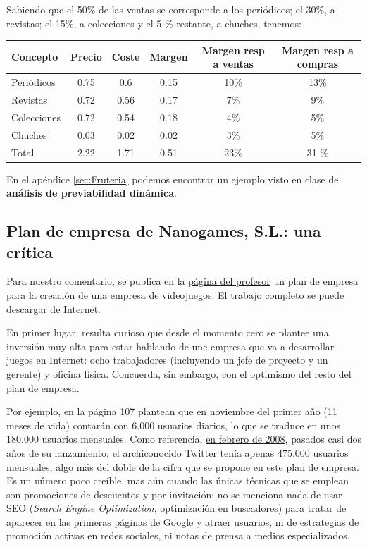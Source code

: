 \documentclass[nochap,palatino,shortheader]{apuntes}
\begin{document}
\begin{example}
Sabiendo que el 50\% de las ventas se corresponde a los periódicos; el 30\%, a revistas; el 15\%, a colecciones y el 5 \% restante, a chuches, tenemos:

\begin{center}
\normalfont\small
\begin{tabular}{l|c|c|c|c|c}
\textbf{Concepto} & \textbf{Precio} & \textbf{Coste} &\textbf{Margen} & \textbf{Margen resp a ventas} & \textbf{Margen resp a compras} \\
\toprule
Periódicos & 0.75 & 0.6 & 0.15 & 10\% & 13\% \\
Revistas & 0.72 & 0.56 & 0.17 & 7\% & 9\%\\
Colecciones & 0.72 & 0.54 & 0.18 & 4\% & 5\%\\
Chuches &0.03 & 0.02 & 0.02 & 3\% & 5\%\\
\bottomrule
Total & 2.22 & 1.71 & 0.51 & 23\% & 31 \% \\
\end{tabular}
\end{center}

\end{example}

En el apéndice \ref{sec:Fruteria} podemos encontrar un ejemplo visto en clase de \textbf{análisis de previabilidad dinámica}.

\subsection{Plan de empresa de Nanogames, S.L.: una crítica}

Para nuestro comentario, se publica en la \href{http://maestremiranda.com/techdir/plan-de-empresa-de-videojuegos-nanogames-s-l/}{página del profesor} un plan de empresa para la creación de una empresa de videojuegos. El trabajo completo \href{https://riunet.upv.es/bitstream/handle/10251/15241/proyecto%20FINAL.pdf}{se puede descargar de Internet}.

En primer lugar, resulta curioso que desde el momento cero se plantee una inversión muy alta para estar hablando de une empresa que va a desarrollar juegos en Internet: ocho trabajadores (incluyendo un jefe de proyecto y un gerente) y oficina física. Concuerda, sin embargo, con el optimismo del resto del plan de empresa.

Por ejemplo, en la página 107 plantean que en noviembre del primer año (11 meses de vida) contarán con 6.000 usuarios diarios, lo que se traduce en unos 180.000 usuarios mensuales. Como referencia, \href{http://www.nielsen.com/us/en/insights/news/2009/twitters-tweet-smell-of-success.html}{en febrero de 2008}, pasados casi dos años de su lanzamiento, el archiconocido Twitter tenía apenas 475.000 usuarios mensuales, algo más del doble de la cifra que se propone en este plan de empresa. Es un número poco creíble, mas aún cuando las únicas técnicas que se emplean son promociones de descuentos y por invitación: no se menciona nada de usar SEO (\textit{Search Engine Optimization}, optimización en buscadores) para tratar de aparecer en las primeras páginas de Google y atraer usuarios, ni de estrategias de promoción activas en redes sociales, ni notas de prensa a medios especializados.
\end{document}
